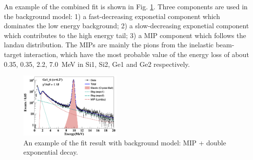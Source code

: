 \documentclass[number,5p]{elsarticle}
\begin{document}
An example of the combined fit is shown in Fig. \ref{fig:e_fit}.
Three components are used in the background model: 1) a
fast-decreasing exponetial component which dominates the low energy background; 2)
a slow-decreasing exponetial component which contributes to the high energy
tail; 3) a MIP component which follows the landau distribution.
The MIPs are mainly the pions from the inelastic beam-target interaction, which
have the most probable value of the energy loss of about \num{0.35}, \num{0.35},
\num{2.2}, \SI{7.0}{MeV} in Si1, Si2, Ge1 and Ge2 respectively.
\begin{figure}[h!]
  \centering
  \includegraphics[width=0.45\textwidth]{./e_fit.png}
  \caption{An example of the fit result with background model: MIP + double
    exponential decay.}
  \label{fig:e_fit}
\end{figure}
\end{document}
